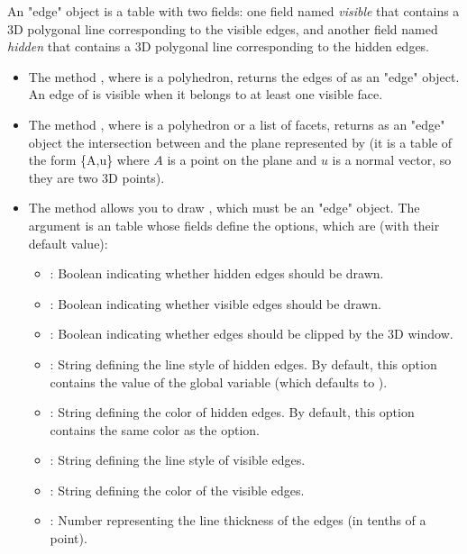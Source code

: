 An "edge" object is a table with two fields: one field named \emph{visible} that contains a 3D polygonal line corresponding to the visible edges, and another field named \emph{hidden} that contains a 3D polygonal line corresponding to the hidden edges.

\begin{itemize}
    \item The method , where  is a polyhedron, returns the edges of  as an "edge" object. An edge of  is visible when it belongs to at least one visible face.

     \item The method , where  is a polyhedron or a list of facets, returns as an "edge" object the intersection between  and the plane represented by  (it is a table of the form \{A,u\} where $A$ is a point on the plane and $u$ is a normal vector, so they are two 3D points).

    \item The method  allows you to draw , which must be an "edge" object. The argument  is an table whose fields define the options, which are (with their default value):
\begin{itemize}
    \item {}: Boolean indicating whether hidden edges should be drawn.
    \item {}: Boolean indicating whether visible edges should be drawn.
    \item {}: Boolean indicating whether edges should be clipped by the 3D window.
    \item {}: String defining the line style of hidden edges. By default, this option contains the value of the global variable  (which defaults to ).
    \item {}: String defining the color of hidden edges. By default, this option contains the same color as the  option.
    \item {}: String defining the line style of visible edges.
     \item {}: String defining the color of the visible edges.
    \item {}: Number representing the line thickness of the edges (in tenths of a point).
\end{itemize}


\end{itemize}
